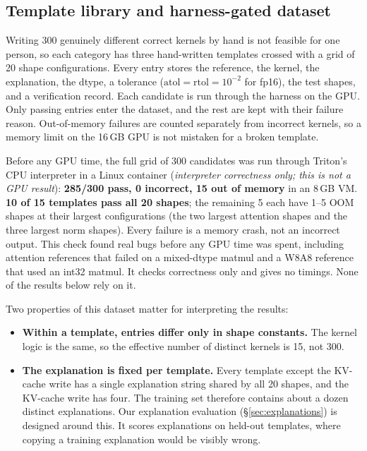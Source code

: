 \documentclass[11pt]{article}
\begin{document}
\subsection{Template library and harness-gated dataset}
\label{sec:dataset}
Writing 300 genuinely different correct kernels by hand is not feasible for one person, so each
category has three hand-written templates crossed with a grid of 20 shape configurations.
Every entry stores the reference, the kernel, the explanation, the dtype, a tolerance
($\mathrm{atol}=\mathrm{rtol}=10^{-2}$ for fp16), the test shapes, and a verification record.
Each candidate is run through the harness on the GPU. Only passing entries enter the dataset, and
the rest are kept with their failure reason. Out-of-memory failures are counted separately from
incorrect kernels, so a memory limit on the 16\,GB GPU is not mistaken for a broken template.

Before any GPU time, the full grid of 300 candidates was run through Triton's CPU interpreter
in a Linux container (\emph{interpreter correctness only; this is not a GPU result}):
\textbf{285/300 pass, 0 incorrect, 15 out of memory} in an 8\,GB VM.
\textbf{10 of 15 templates pass all 20 shapes}; the remaining 5 each have 1--5 OOM shapes at
their largest configurations (the two largest attention shapes and the three largest norm shapes).
Every failure is a memory crash, not an incorrect output.
This check found real bugs before any GPU time was spent, including attention references that
failed on a mixed-dtype matmul and a W8A8 reference that used an int32 matmul.
It checks correctness only and gives no timings. None of the results below rely on it.

Two properties of this dataset matter for interpreting the results:
\begin{itemize}
  \item \textbf{Within a template, entries differ only in shape constants.} The kernel logic is the
        same, so the effective number of distinct kernels is 15, not 300.
  \item \textbf{The explanation is fixed per template.} Every template except the KV-cache write
        has a single explanation string shared by all 20 shapes, and the KV-cache write has four.
        The training set therefore contains about a dozen distinct explanations. Our explanation
        evaluation (\S\ref{sec:explanations}) is designed around this. It scores explanations on
        held-out templates, where copying a training explanation would be visibly wrong.
\end{itemize}
\end{document}
